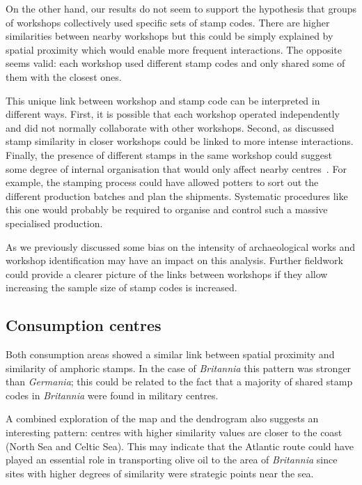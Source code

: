 On the other hand, our results do not seem to support the hypothesis that groups of workshops collectively used specific sets of stamp codes. There are higher similarities between nearby workshops but this could be simply explained by spatial proximity which would enable more frequent interactions. The opposite seems valid: each workshop used different stamp codes and only shared some of them with the closest ones. 

This unique link between workshop and stamp code can be interpreted in different ways. First, it is possible that each workshop operated independently and did not normally collaborate with other workshops. Second, as discussed stamp similarity in closer workshops could be linked to more intense interactions. Finally, the presence of different stamps in the same workshop could suggest some degree of internal organisation that would only affect nearby centres~\citep[104]{juanmorostesis}. For example, the stamping process could have allowed potters to sort out the different production batches and plan the shipments. Systematic procedures like this one would probably be required to organise and control such a massive specialised production.

As we previously discussed some bias on the intensity of archaeological works and workshop identification may have an impact on this analysis. Further fieldwork could provide a clearer picture of the links between workshops if they allow increasing the sample size of stamp codes is increased.

\subsection{Consumption centres}
\label{sec:7}

Both consumption areas showed a similar link between spatial proximity and similarity of amphoric stamps. In the case of  \textit{Britannia} this pattern was stronger than \textit{Germania}; this could be related to the fact that a majority of shared stamp codes in \textit{Britannia} were found in military centres.  

A combined exploration of the map and the dendrogram also suggests an interesting pattern: centres with higher similarity values are closer to the coast (North Sea and Celtic Sea). This may indicate that the Atlantic route could have played an essential role in transporting olive oil to the area of \textit{Britannia} since sites with higher degrees of similarity were strategic points near the sea.


